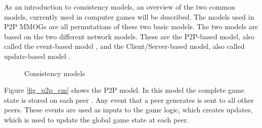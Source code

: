 \documentclass[journal,oneside,a4paper,onecolumn]{IEEEtran}
\begin{document}
As an introduction to consistency models, an overview of the two common models, currently used in computer games will be described. The models used in P2P MMOGs are all permutations of these two basic models. The two models are based on the two different network models. These are the P2P-based model, also called the event-based model \cite{p2p_cm_aoe}, and the Client/Server-based model, also called update-based model \cite{unreal_networking}.

\begin{figure}[htbp]
\centering
{}
\caption{Consistency models}
\end{figure}
%
Figure \ref{fig_p2p_cm} shows the P2P model. In this model the complete game state is stored on each peer \cite{}. Any event that a peer generates is sent to all other peers. These events are used as inputs to the game logic, which creates updates, which is used to update the global game state at each peer.
\end{document}
